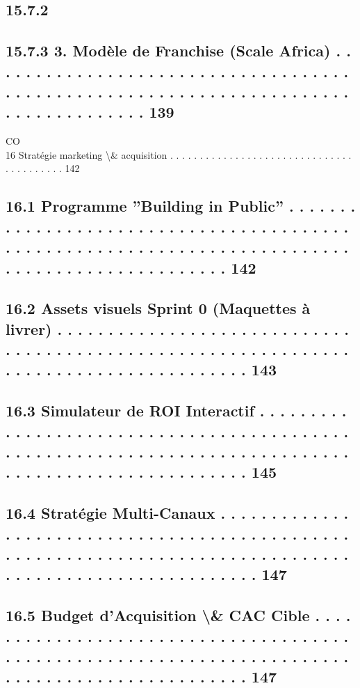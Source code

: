 \subsection{15.7.2}
\subsection{15.7.3              3. Modèle de Franchise (Scale Africa) . . . . . . . . . . . . . . . . . . . . . . . . . . . . . . . . . . . . . . . . . . . . . . . . . . . . . . . . . . . . . . . . . . . . . . . . . . . . . . . . . . . . 139}
CO\\
16    Stratégie marketing \textbackslash{}& acquisition . . . . . . . . . . . . . . . . . . . . . . . . . . . . . . . . . . . . . . . . . 142\\
\subsection{16.1    Programme ”Building in Public” . . . . . . . . . . . . . . . . . . . . . . . . . . . . . . . . . . . . . . . . . . . . . . . . . . . . . . . . . . . . . . . . . . . . . . . . . . . . . . . . . . . . . . . . . . . . . . . . . 142}
\subsection{16.2    Assets visuels Sprint 0 (Maquettes à livrer) . . . . . . . . . . . . . . . . . . . . . . . . . . . . . . . . . . . . . . . . . . . . . . . . . . . . . . . . . . . . . . . . . . . . . . . . . . . . . . . . . . . . . . . 143}
\subsection{16.3    Simulateur de ROI Interactif . . . . . . . . . . . . . . . . . . . . . . . . . . . . . . . . . . . . . . . . . . . . . . . . . . . . . . . . . . . . . . . . . . . . . . . . . . . . . . . . . . . . . . . . . . . . . . . . . . . . . 145}
\subsection{16.4    Stratégie Multi-Canaux . . . . . . . . . . . . . . . . . . . . . . . . . . . . . . . . . . . . . . . . . . . . . . . . . . . . . . . . . . . . . . . . . . . . . . . . . . . . . . . . . . . . . . . . . . . . . . . . . . . . . . . . . . 147}
\subsection{16.5    Budget d’Acquisition \textbackslash{}& CAC Cible . . . . . . . . . . . . . . . . . . . . . . . . . . . . . . . . . . . . . . . . . . . . . . . . . . . . . . . . . . . . . . . . . . . . . . . . . . . . . . . . . . . . . . . . . . . . . . . . 147}
